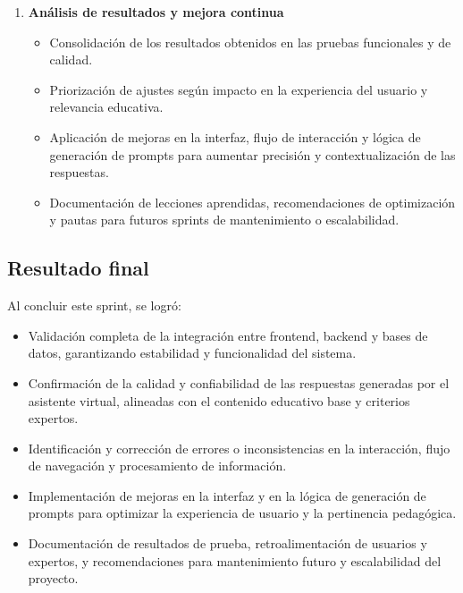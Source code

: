 \begin{enumerate}
      \item \textbf{Análisis de resultados y mejora continua}
            \begin{itemize}
                  \item Consolidación de los resultados obtenidos en las pruebas funcionales y de
                        calidad.
                  \item Priorización de ajustes según impacto en la experiencia del usuario y
                        relevancia educativa.
                  \item Aplicación de mejoras en la interfaz, flujo de interacción y lógica de
                        generación de prompts para aumentar precisión y contextualización de las
                        respuestas.
                  \item Documentación de lecciones aprendidas, recomendaciones de optimización y pautas
                        para futuros sprints de mantenimiento o escalabilidad.
            \end{itemize}
\end{enumerate}

\subsection{Resultado final}
Al concluir este sprint, se logró:

\begin{itemize}
      \item Validación completa de la integración entre frontend, backend y bases de datos,
            garantizando estabilidad y funcionalidad del sistema.
      \item Confirmación de la calidad y confiabilidad de las respuestas generadas por el
            asistente virtual, alineadas con el contenido educativo base y criterios
            expertos.
      \item Identificación y corrección de errores o inconsistencias en la interacción,
            flujo de navegación y procesamiento de información.
      \item Implementación de mejoras en la interfaz y en la lógica de generación de
            prompts para optimizar la experiencia de usuario y la pertinencia pedagógica.
      \item Documentación de resultados de prueba, retroalimentación de usuarios y
            expertos, y recomendaciones para mantenimiento futuro y escalabilidad del
            proyecto.
\end{itemize}

